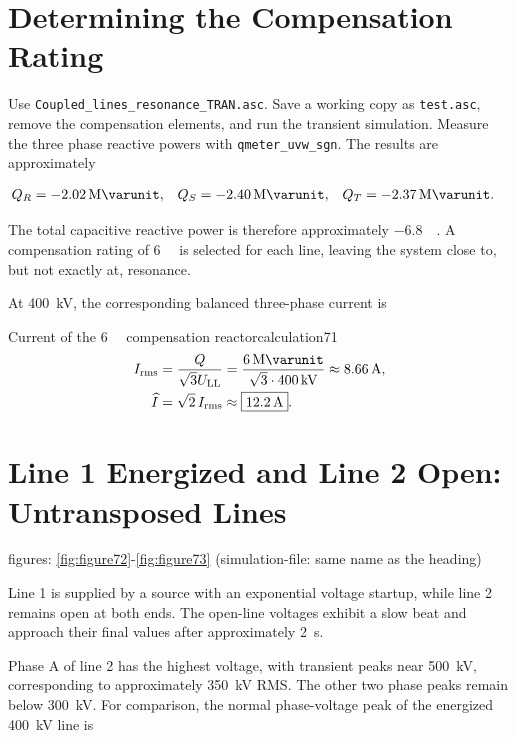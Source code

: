 \section{Determining the Compensation Rating}
\label{sec:coupled-line-compensation-rating}

Use \texttt{Coupled\_lines\_resonance\_TRAN.asc}. Save a working copy as
\texttt{test.asc}, remove the compensation elements, and run the transient
simulation. Measure the three phase reactive powers with
\texttt{qmeter\_uvw\_sgn}. The results are approximately

\begin{align}
Q_R&=\SI{-2.02}{\mega\varunit},&
Q_S&=\SI{-2.40}{\mega\varunit},&
Q_T&=\SI{-2.37}{\mega\varunit}.
\end{align}

The total capacitive reactive power is therefore approximately
\SI{-6.8}{\mega\varunit}. A compensation rating of
\SI{+6}{\mega\varunit} is selected for each line, leaving the system close to,
but not exactly at, resonance.

At \SI{400}{\kilo\volt}, the corresponding balanced three-phase current is

\begin{calculation}{Current of the \SI{6}{\mega\varunit} compensation reactor}{calculation71}
\begin{align}
I_{\mathrm{rms}}
 &=\frac{Q}{\sqrt{3}U_{\mathrm{LL}}}
   =\frac{\SI{6}{\mega\varunit}}
          {\sqrt{3}\cdot\SI{400}{\kilo\volt}}
   \approx\SI{8.66}{\ampere},\\
\widehat I&=\sqrt{2}\,I_{\mathrm{rms}}
   \approx\boxed{\SI{12.2}{\ampere}}.
\end{align}
\end{calculation}

\section{Line 1 Energized and Line 2 Open: Untransposed Lines} figures: \ref{fig:figure72}-\ref{fig:figure73}  (simulation-file: same name as the heading)
\label{sec:coupled-lines-open-untransposed}

Line 1 is supplied by a source with an exponential voltage startup, while line 2 remains
open at both ends. The open-line voltages exhibit a slow beat and approach
their final values after approximately \SI{2}{\second}.

Phase A of line 2 has the highest voltage, with transient peaks near
\SI{500}{\kilo\volt}, corresponding to approximately
\SI{350}{\kilo\volt} RMS. The other two phase peaks remain below
\SI{300}{\kilo\volt}. For comparison, the normal phase-voltage peak of the
energized \SI{400}{\kilo\volt} line is


